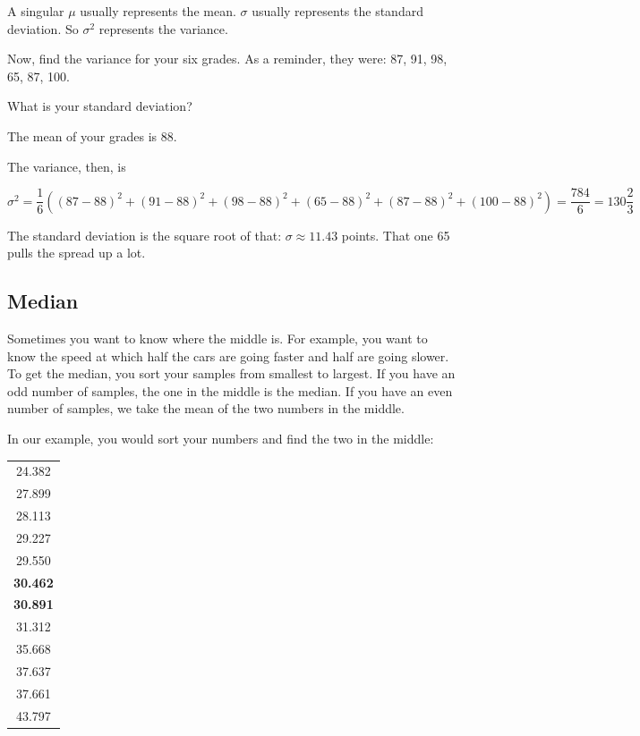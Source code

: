 A singular $\mu$ usually represents the mean. $\sigma$ usually represents
the standard deviation. So $\sigma^2$ represents the variance.

\begin{Exercise}[title={Variance of Grades}, label=grades_variance]

  Now, find the variance for your six grades. As a reminder, they were: 87, 91, 98, 65, 87, 100.

  What is your standard deviation?

\end{Exercise}
\begin{Answer}[ref=grades_variance]

  The mean of your grades is $88$.

  The variance, then, is

  $$\sigma^2 = \frac{1}{6} \left((87 - 88)^2 + (91 - 88)^2 + (98 - 88)^2 + (65 - 88)^2 + (87 - 88)^2 + (100 - 88)^2 \right) = \frac{784}{6} = 130 \frac{2}{3}$$

  The standard deviation is the square root of that: $\sigma \approx 11.43$ points. That one 65 pulls the spread up a lot.
  
\end{Answer}


\subsection{Median}

Sometimes you want to know where the middle is. For example, you want
to know the speed at which half the cars are going faster and half are
going slower. To get the median, you sort your samples from smallest
to largest. If you have an odd number of samples, the one in the
middle is the median. If you have an even number of samples, we take
the mean of the two numbers in the middle.

In our example, you would sort your numbers and find the two in the middle:

\begin{tabular}{c}
24.382\\
27.899\\
28.113\\
29.227\\
29.550\\
\hline
\textbf{30.462}\\
\textbf{30.891}\\
\hline 
31.312\\
35.668\\
37.637\\
37.661\\
43.797\\
\end{tabular}

